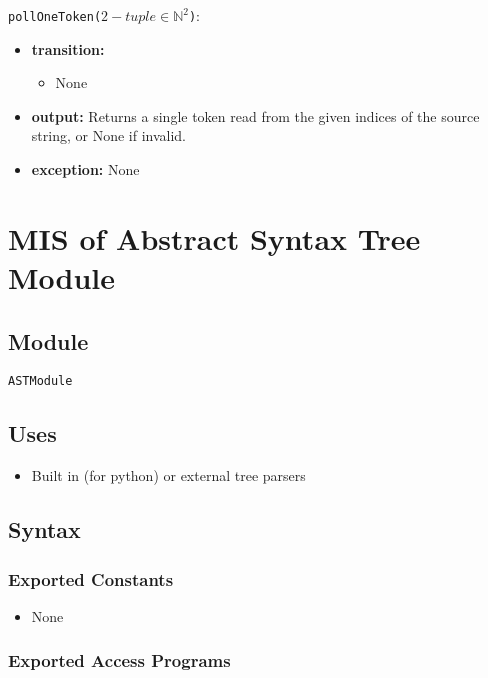 \documentclass[12pt, titlepage]{article}
\begin{document}
\noindent \texttt{pollOneToken($2-tuple \in \mathbb{N}^2$)}:
\begin{itemize}
    \item \textbf{transition:}
    \begin{itemize}
        \item None
    \end{itemize}
    \item \textbf{output:} Returns a single token read from the given indices of the source string, or None if invalid.
    \item \textbf{exception:} None
\end{itemize}

\section{MIS of Abstract Syntax Tree Module} \label{smAST}

\subsection{Module}

\texttt{ASTModule}

\subsection{Uses}

\begin{itemize}
    \item Built in (for python) or external tree parsers
\end{itemize}

\subsection{Syntax}

\subsubsection{Exported Constants}

\begin{itemize}
    \item None
\end{itemize}

\subsubsection{Exported Access Programs}
\end{document}
